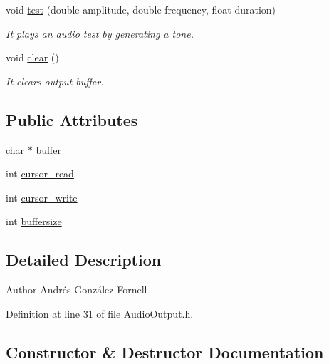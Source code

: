 \begin{DoxyCompactItemize}
void \hyperlink{class_output_device_a78e2163a6f7051d49d3483234003d684}{test} (double amplitude, double frequency, float duration)
\begin{DoxyCompactList}\small\item\em It plays an audio test by generating a tone. \end{DoxyCompactList}\item 
\mbox{\label{class_output_device_a9c3515a8c1812a08bd74d87389554767}} 
void \hyperlink{class_output_device_a9c3515a8c1812a08bd74d87389554767}{clear} ()
\begin{DoxyCompactList}\small\item\em It clears output buffer. \end{DoxyCompactList}\end{DoxyCompactItemize}
\subsection*{Public Attributes}
\begin{DoxyCompactItemize}
\item 
char $\ast$ \hyperlink{class_output_device_adf56f9d3e97d766a2e2b04c7bc743ee2}{buffer}
\item 
int \hyperlink{class_output_device_ab49ebf067d9b6f15f2305d5028cde85e}{cursor\+\_\+read}
\item 
int \hyperlink{class_output_device_ad770c7e5e833ccd9030382e16691f331}{cursor\+\_\+write}
\item 
int \hyperlink{class_output_device_a04e2fe4f9b7a15bf6993144d49f29461}{buffersize}
\end{DoxyCompactItemize}


\subsection{Detailed Description}
\begin{DoxyAuthor}{Author}
Andrés González Fornell 
\end{DoxyAuthor}


Definition at line 31 of file Audio\+Output.\+h.



\subsection{Constructor \& Destructor Documentation}
\mbox{\label{class_output_device_aa1e4dbe8403fb3fc022f71e3e3c26ee7}} 
